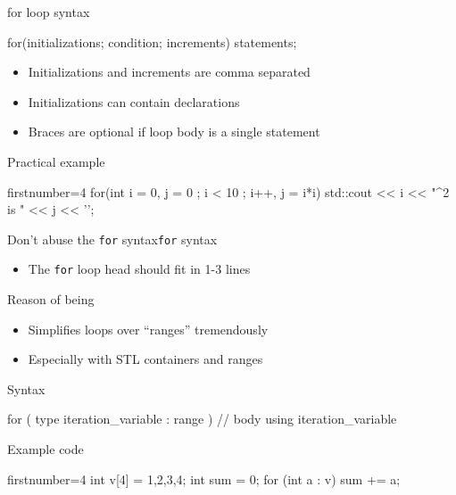 \begin{frame}[fragile]
  \begin{block}{for loop syntax}
    \begin{cppcode*}{}
      for(initializations; condition; increments) {
        statements;
      }
    \end{cppcode*}
    \vspace{-0.2cm}
    \begin{itemize}
      \item Initializations and increments are comma separated
      \item Initializations can contain declarations
      \item Braces are optional if loop body is a single statement
    \end{itemize}
  \end{block}
  \pause
  \begin{exampleblock}{Practical example}
    \begin{cppcode*}{firstnumber=4}
      for(int i = 0, j = 0 ; i < 10 ; i++, j = i*i) {
        std::cout << i << "^2 is " << j << '\n';
      }
    \end{cppcode*}
  \end{exampleblock}
  \pause
  \begin{goodpracticeWithShortcut}{Don't abuse the \texttt{for} syntax}{\texttt{for} syntax}
    \begin{itemize}
      \item The \texttt{for} loop head should fit in 1-3 lines
    \end{itemize}
  \end{goodpracticeWithShortcut}
\end{frame}

\begin{frame}[fragile]
  \begin{block}{Reason of being}
    \begin{itemize}
    \item Simplifies loops over ``ranges'' tremendously
    \item Especially with STL containers and ranges
    \end{itemize}
  \end{block}
  \begin{block}{Syntax}
    \begin{cppcode*}{}
      for ( type iteration_variable : range ) {
        // body using iteration_variable
      }
    \end{cppcode*}
  \end{block}
  \begin{exampleblock}{Example code}
    \begin{cppcode*}{firstnumber=4}
      int v[4] = {1,2,3,4};
      int sum = 0;
      for (int a : v) { sum += a; }
    \end{cppcode*}
  \end{exampleblock}
\end{frame}

